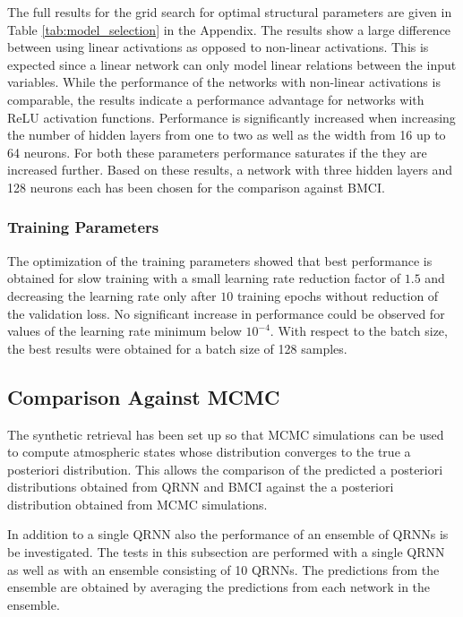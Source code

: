 \documentclass[journal abbreviation, manuscript]{copernicus}
\begin{document}
  The full results for the grid search for optimal structural parameters are
  given in Table \ref{tab:model_selection} in the Appendix. The results show a
  large difference between using linear activations as opposed to non-linear
  activations. This is expected since a linear network can only model linear
  relations between the input variables. While the performance of the networks
  with non-linear activations is comparable, the results indicate a performance
  advantage for networks with ReLU activation functions. Performance is
  significantly increased when increasing the number of hidden layers from one
  to two as well as the width from 16 up to 64 neurons. For both these
  parameters performance saturates if the they are increased further. Based on
  these results, a network with three hidden layers and 128 neurons each has
  been chosen for the comparison against BMCI.

 \subsubsection{Training Parameters}

  The optimization of the training parameters showed that best performance is
  obtained for slow training with a small learning rate reduction factor of
  $1.5$ and decreasing the learning rate only after $10$ training epochs
  without reduction of the validation loss. No significant increase in
  performance could be observed for values of the learning rate minimum below
  $10^{-4}$. With respect to the batch size, the best results were obtained for
  a batch size of 128 samples.

\subsection{Comparison Against MCMC}

  The synthetic retrieval has been set up so that MCMC simulations can be used
  to compute atmospheric states whose distribution converges to the true a
  posteriori distribution. This allows the comparison of the predicted a
  posteriori distributions obtained from QRNN and BMCI against the a posteriori
  distribution obtained from MCMC simulations.

  In addition to a single QRNN also the performance of an ensemble of QRNNs is
  be investigated. The tests in this subsection are performed with a single QRNN
  as well as with an ensemble consisting of 10 QRNNs. The predictions from the
  ensemble are obtained by averaging the predictions from each network in the
  ensemble.
\end{document}
